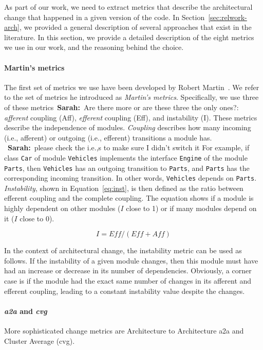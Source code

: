 \documentclass[sigplan, anonymous, review]{acmart}
\newcommand{\sn}[1]{{\color{blue}\textbf{Sarah:}~#1}}
\newcommand{\checkNum}[1]{{\color{orange}#1}}
\begin{document}
As part of our work, we need to extract metrics that describe the architectural change that happened in a given version of the code. 
In Section~\ref{sec:relwork-arch}, we provided a general description of several approaches that exist in the literature.
In this section, we provide a detailed description of the \checkNum{eight} metrics we use in our work, and the reasoning behind the choice.


\paragraph{Martin's metrics} 
The first set of metrics we use have been developed by Robert Martin~\cite{martinsMetrics}.
We refer to the set of metrics he introduced as \textit{Martin's metrics}.
Specifically, we use three of these metrics~\sn{Are there more or are these three the only ones?}: \textit{afferent} coupling (Aff), \textit{efferent} coupling (Eff), and instability (I).
These metrics describe the independence of modules. 
\textit{Coupling} describes how many incoming (i.e., afferent) or outgoing (i.e., efferent) transitions a module has. ~\sn{please check the i.e.,s to make sure I didn't switch it}
For example, if class \texttt{Car} of module \texttt{Vehicles} implements the interface \texttt{Engine} of the module \texttt{Parts}, then \texttt{Vehicles} has an outgoing transition to \texttt{Parts}, and \texttt{Parts} has the corresponding incoming transition. 
In other words, \texttt{Vehicles} depends on \texttt{Parts}.
\textit{Instability}, shown in Equation~\ref{eq:inst}, is then defined as the ratio between efferent coupling and the complete coupling.
The equation shows if a module is highly dependent on other modules ($I$ close to 1) or if many modules depend on it ($I$ close to 0).

\begin{equation} \label{eq:inst}
I = \textit{Eff} / (\textit{Eff} + \textit{Aff})
\end{equation}

In the context of architectural change, the instability metric can be used as follows. If the instability of a given module changes, then this module must have had an increase or decrease in its number of dependencies. 
Obviously, a corner case is if the module had the exact same number of changes in its afferent and efferent coupling, leading to a constant instability value despite the changes.

\paragraph{\textit{a2a} and \textit{cvg}} More sophisticated change metrics are Architecture to Architecture {a2a} and Cluster Average (cvg). 
\end{document}
